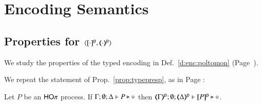 \section{Encoding Semantics}




\subsection{Properties for $\encod{\cdot}{\cdot}{\mathsf{p}}$}
\label{app:polmon}
We study the properties of the typed encoding in
Def.~\ref{d:enc:poltomon} (Page~\pageref{d:enc:poltomon}).

We repeat the statement of Prop.~\ref{prop:typepresp}, as in Page \pageref{prop:typepresp}:
\begin{proposition}
Let $P$ be an  $\mathsf{HO}\pi$ process.
If			$\Gamma; \emptyset; \Delta \vdash P \triangleright \diamond$ then 
			$\mapt{\Gamma}^{\mathsf{p}}; \emptyset; \mapt{\Delta}^{\mathsf{p}} \proves \map{P}^{\mathsf{p}} \hastype \Proc$. 
\end{proposition}

